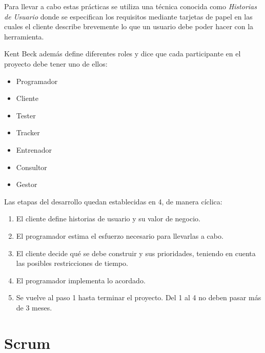 Para llevar a cabo estas prácticas se utiliza una técnica conocida
como \emph{Historias de Usuario} donde se especifican los requisitos
mediante tarjetas de papel en las cuales el cliente describe
brevemente lo que un usuario debe poder hacer con la herramienta.

Kent Beck además define diferentes roles y dice que cada participante
en el proyecto debe tener uno de ellos:
\begin{itemize}
\item Programador
\item Cliente
\item Tester
\item Tracker
\item Entrenador
\item Consultor
\item Gestor
\end{itemize}

Las etapas del desarrollo quedan establecidas en 4, de manera cíclica:
\begin{enumerate}
\item El cliente define historias de usuario y su valor de negocio.
\item El programador estima el esfuerzo necesario para llevarlas a
  cabo.
\item El cliente decide qué se debe construir y sus prioridades,
  teniendo en cuenta las posibles restricciones de tiempo.
\item El programador implementa lo acordado.
\item Se vuelve al paso 1 hasta terminar el proyecto. Del 1 al 4 no
  deben pasar más de 3 meses.
\end{enumerate}

\section{Scrum}
\label{sec:scrum}

